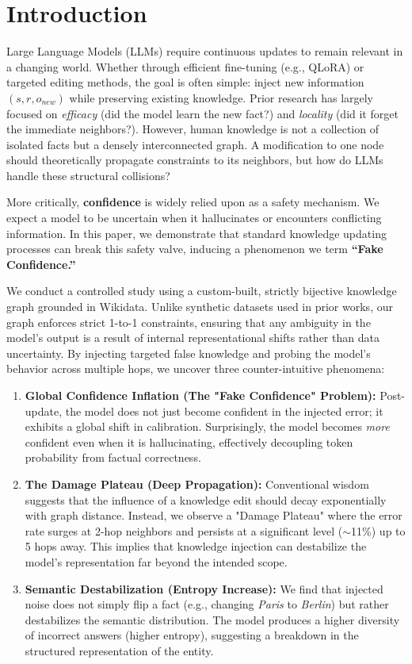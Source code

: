 \section{Introduction}
\label{sec:intro}

Large Language Models (LLMs) require continuous updates to remain relevant in a changing world. Whether through efficient fine-tuning (e.g., QLoRA) or targeted editing methods, the goal is often simple: inject new information $(s, r, o_{new})$ while preserving existing knowledge. 
Prior research has largely focused on \textit{efficacy} (did the model learn the new fact?) and \textit{locality} (did it forget the immediate neighbors?). 
However, human knowledge is not a collection of isolated facts but a densely interconnected graph. A modification to one node should theoretically propagate constraints to its neighbors, but how do LLMs handle these structural collisions?

More critically, \textbf{confidence} is widely relied upon as a safety mechanism. We expect a model to be uncertain when it hallucinates or encounters conflicting information.
In this paper, we demonstrate that standard knowledge updating processes can break this safety valve, inducing a phenomenon we term \textbf{``Fake Confidence.''}

We conduct a controlled study using a custom-built, strictly bijective knowledge graph grounded in Wikidata. Unlike synthetic datasets used in prior works, our graph enforces strict 1-to-1 constraints, ensuring that any ambiguity in the model's output is a result of internal representational shifts rather than data uncertainty. By injecting targeted false knowledge and probing the model's behavior across multiple hops, we uncover three counter-intuitive phenomena:

\begin{enumerate}
    \item \textbf{Global Confidence Inflation (The "Fake Confidence" Problem):} Post-update, the model does not just become confident in the injected error; it exhibits a global shift in calibration. Surprisingly, the model becomes \textit{more} confident even when it is hallucinating, effectively decoupling token probability from factual correctness.
    
    \item \textbf{The Damage Plateau (Deep Propagation):} Conventional wisdom suggests that the influence of a knowledge edit should decay exponentially with graph distance. Instead, we observe a "Damage Plateau" where the error rate surges at 2-hop neighbors and persists at a significant level ($\sim$11\%) up to 5 hops away. This implies that knowledge injection can destabilize the model's representation far beyond the intended scope.
    
    \item \textbf{Semantic Destabilization (Entropy Increase):} We find that injected noise does not simply flip a fact (e.g., changing \textit{Paris} to \textit{Berlin}) but rather destabilizes the semantic distribution. The model produces a higher diversity of incorrect answers (higher entropy), suggesting a breakdown in the structured representation of the entity.
\end{enumerate}

